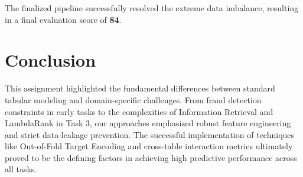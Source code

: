 \documentclass[a4paper,12pt]{extarticle}
\begin{document}
The finalized pipeline successfully resolved the extreme data imbalance, resulting in a final evaluation score of \textbf{84}.

\clearpage
\section{Conclusion}
This assignment highlighted the fundamental differences between standard tabular modeling and domain-specific challenges. From fraud detection constraints in early tasks to the complexities of Information Retrieval and LambdaRank in Task 3, our approaches emphasized robust feature engineering and strict data-leakage prevention. The successful implementation of techniques like Out-of-Fold Target Encoding and cross-table interaction metrics ultimately proved to be the defining factors in achieving high predictive performance across all tasks.
\end{document}
